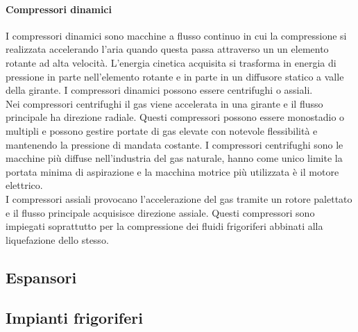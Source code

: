 \paragraph{Compressori dinamici}
I compressori dinamici sono macchine a flusso continuo in cui la compressione si realizzata accelerando l'aria quando questa passa attraverso un un elemento rotante ad alta velocità. L'energia cinetica acquisita si trasforma in energia di pressione in parte nell'elemento rotante e in parte in un diffusore statico a valle della girante. I compressori dinamici possono essere centrifughi o assiali.\\
Nei compressori centrifughi il gas viene accelerata in una girante e il flusso principale ha direzione radiale. Questi compressori possono essere monostadio o multipli e possono gestire portate di gas elevate con notevole flessibilità e mantenendo la pressione di mandata costante. I compressori centrifughi sono le macchine più diffuse nell'industria del gas naturale, hanno come unico limite la portata minima di aspirazione e la macchina motrice più utilizzata è il motore elettrico.\\
I compressori assiali provocano l'accelerazione del gas tramite un rotore palettato e il flusso principale acquisisce direzione assiale. Questi compressori sono impiegati soprattutto per la compressione dei fluidi frigoriferi abbinati alla liquefazione dello stesso.

\subsection{Espansori}

\subsection{Impianti frigoriferi}



